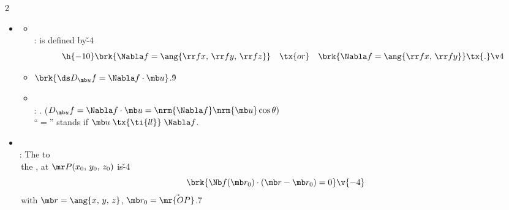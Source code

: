 \documentclass[dvipdfmx,a4paper,titlepage,9pt]{jsarticle}
\begin{document}
\begin{multicols*}{2}
\begin{itemize}[label={-}]
\begin{itemize}[label=\Cdot]
\item {}.

\begin{Pfbox}
Let $x_0'=x_0+ha$, $y_0'=y_0+hb$, $\mb x'=(x_0',\,y_0')$, \\
$\mb x=(x_0,\,y_0)$.
$$\begin{aligned}
D_{\mb u}f(\mb x)&=\lim_{h\to0}\frac{f(\mb x')-f(\mb x)}{h}\\
&=\lim_{h\to0}\frac1h\left(\begin{aligned}&f({\mb x'})-f(x_0,\,{y_0'})\\+{}&f(x_0,\,{y_0'})-f(\mb x)\end{aligned}\right)\\
&=\lim_{h\to0}\left(\begin{aligned}&a(f({\mb x'})-f(x_0,\,{y_0'}))/(ah)\\+{}&b(f(x_0,\,{y_0'})-f(\mb x))/(bh)\end{aligned}\right)\\
&=a\rr fx+b\rr fy\tx{.}
\end{aligned}\v{-10}$$
\end{Pfbox}
\end{itemize}
\;

\item{}
\begin{itemize}[label=\Cdot]
\setlength{\leftskip}{-10pt}
\item{}\\
:  is defined by\v{-4}
$$\h{-10}\brk{\Nabla f=\ang{\rr fx,\,\rr fy,\,\rr fz}}\quad\tx{or}\quad\brk{\Nabla f=\ang{\rr fx,\,\rr fy}}\tx{.}\v4$$

\item$\brk{\ds D_{\mb u}f=\Nabla f\cdot\mb u}$.\v9

\item{}\\
: . {\Gray ($D_{\mb u}f=\Nabla f\cdot\mb u=\nrm{\Nabla f}\nrm{\mb u}\cos\theta)$}\\
\;\;``$=$'' stands if $\mb u\mathrel{\tx{\ti{l\!\!\:\!\:l}}} \Nabla f$.
\end{itemize}
\vfill\null\columnbreak
\item{}\\
: The  to\\
\;\;\,the , at $\mr P(x_0,\,y_0,\,z_0)$ is\v{-4}
$$\brk{\Nb f(\mb r_0)\cdot(\mb r-\mb r_0)=0}\v{-4}$$
\;\;\,with $\mb r=\ang{x,\,y,\,z}$, $\mb r_0=\Vec{\mr{OP}}$.\v7
\end{itemize}


\end{multicols*}
\end{document}
